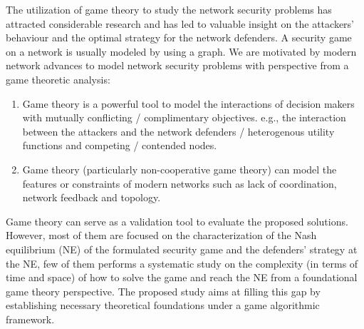 \documentclass[10pt]{article}
\theoremstyle{definition}
\begin{document}
The utilization of game theory to study the network security problems has attracted considerable 
research and has led to valuable insight on the attackers’ behaviour and the optimal strategy for 
the network defenders. A security game on a network 
is usually modeled by using a graph. We are motivated by modern network advances
to model network security problems with perspective from a game theoretic
analysis:
\begin{enumerate}
	\item Game theory is a powerful tool to model the 
interactions of decision makers with mutually conflicting / complimentary objectives.
 e.g., the interaction between the attackers and the network defenders /
 heterogenous utility functions and competing / contended nodes.
	\item Game theory (particularly non-cooperative game theory) can model the
    features or constraints of modern networks such as lack of coordination,
    network feedback and topology.
\end{enumerate}

Game theory can serve as a validation tool to evaluate the proposed solutions.
However, most of them are focused on the characterization of the Nash equilibrium (NE) of the formulated security game and the defenders’ strategy at the NE, few of them performs a systematic study on the
complexity (in terms of time and space) of how to solve the game and reach the
NE from a foundational game theory perspective. The proposed study aims at
filling this gap by establishing necessary theoretical foundations under a game algorithmic framework.
\end{document}
